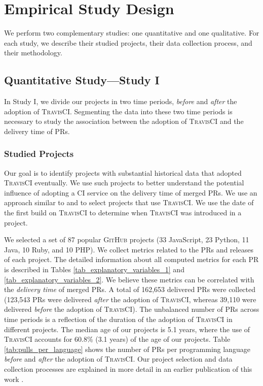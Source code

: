 \section{Empirical Study Design}
\label{sec_empirical_study}

We perform two complementary studies: one quantitative and one qualitative. For each study, we describe their studied projects, their data collection process, and their methodology.

\subsection{\textbf{Quantitative Study---Study I}}
\label{sec_quantitative_study}

In Study I, we divide our projects in two time periods, \textit{before} and \textit{after} the adoption of \textsc{TravisCI}. Segmenting the data into these two time periods is necessary to study the association between the adoption of \textsc{TravisCI} and the delivery time of PRs.

\subsubsection{Studied Projects}
\label{subsec_quant_studided_projects}

Our goal is to identify projects with substantial historical data that adopted \textsc{TravisCI} eventually. We use such projects to better understand the potential influence of adopting a CI service on the delivery time of merged PRs. We use an approach similar to \cite{Vasilescu2015-tn} and \cite{Hilton2016-xy} to select projects that use \textsc{TravisCI}. We use the date of the first build on \textsc{TravisCI} to determine when \textsc{TravisCI} was introduced in a project. 

We selected a set of 87 popular \textsc{GitHub} projects (33 JavaScript, 23 Python, 11 Java, 10 Ruby, and 10 PHP). We collect metrics related to the PRs and releases of each project. 
The detailed information about all computed metrics for each PR is described in Tables \ref{tab_explanatory_variables_1} and \ref{tab_explanatory_variables_2}. We believe these metrics can be correlated with the \textit{delivery time} of merged PRs. A total of 162,653 delivered PRs were collected (123,543 PRs were delivered \textit{after} the adoption of \textsc{TravisCI}, whereas 39,110 were delivered \textit{before} the adoption of \textsc{TravisCI}). The unbalanced number of PRs across time periods is a reflection of the duration of the adoption of \textsc{TravisCI} in different projects. The median age of our projects is 5.1 years, where the use of \textsc{TravisCI} accounts for 60.8\% (3.1 years) of the age of our projects. Table \ref{tab:pulls_per_language} shows the number of PRs per programming language \textit{before} and \textit{after} the adoption of \textsc{TravisCI}. Our project selection and data collection processes are explained in more detail in an earlier publication of this work \citep{bernardo2018studying}.

